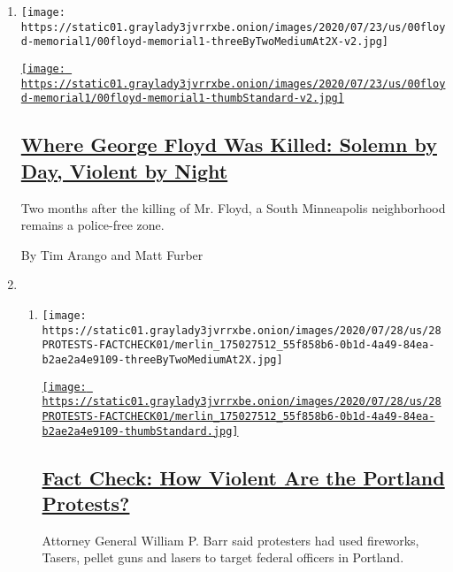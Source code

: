 \begin{enumerate}
\def\labelenumi{\arabic{enumi}.}
\item
  \texttt{[image: https://static01.graylady3jvrrxbe.onion/images/2020/07/23/us/00floyd-memorial1/00floyd-memorial1-threeByTwoMediumAt2X-v2.jpg]}

  \href{/2020/07/29/us/george-floyd-memorial.html}{\texttt{[image: https://static01.graylady3jvrrxbe.onion/images/2020/07/23/us/00floyd-memorial1/00floyd-memorial1-thumbStandard-v2.jpg]}}

  \hypertarget{where-george-floyd-was-killed-solemn-by-day-violent-by-night}{%
  \subsection{\texorpdfstring{\href{/2020/07/29/us/george-floyd-memorial.html}{Where
  George Floyd Was Killed: Solemn by Day, Violent by
  Night}}{Where George Floyd Was Killed: Solemn by Day, Violent by Night}}\label{where-george-floyd-was-killed-solemn-by-day-violent-by-night}}

  Two months after the killing of Mr. Floyd, a South Minneapolis
  neighborhood remains a police-free zone.

  By Tim Arango and Matt Furber
\item
  \begin{enumerate}
  \def\labelenumii{\arabic{enumii}.}
  \item
    \texttt{[image: https://static01.graylady3jvrrxbe.onion/images/2020/07/28/us/28PROTESTS-FACTCHECK01/merlin\_175027512\_55f858b6-0b1d-4a49-84ea-b2ae2a4e9109-threeByTwoMediumAt2X.jpg]}

    \href{/2020/07/28/us/portland-protests-fact-check.html}{\texttt{[image: https://static01.graylady3jvrrxbe.onion/images/2020/07/28/us/28PROTESTS-FACTCHECK01/merlin\_175027512\_55f858b6-0b1d-4a49-84ea-b2ae2a4e9109-thumbStandard.jpg]}}

    \hypertarget{fact-check-how-violent-are-the-portland-protests}{%
    \subsection{\texorpdfstring{\href{/2020/07/28/us/portland-protests-fact-check.html}{Fact
    Check: How Violent Are the Portland
    Protests?}}{Fact Check: How Violent Are the Portland Protests?}}\label{fact-check-how-violent-are-the-portland-protests}}

    Attorney General William P. Barr said protesters had used fireworks,
    Tasers, pellet guns and lasers to target federal officers in
    Portland.


\end{enumerate}
\end{enumerate}
